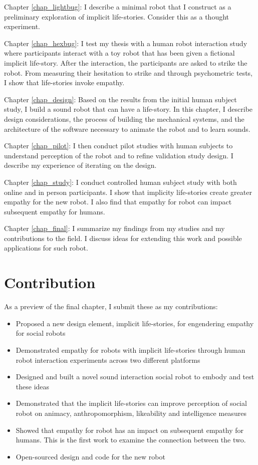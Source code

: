 Chapter \ref{chap_lightbug}: I describe a minimal robot that I construct as a preliminary exploration
of implicit life-stories. Consider this as a thought experiment. 

Chapter \ref{chap_hexbug}: I test my thesis with a human robot interaction study where participants interact with a toy robot that has been given a fictional implicit life-story. After the interaction, the participants are asked to strike the robot. From measuring their hesitation to strike and through psychometric tests, I show that life-stories invoke empathy.

Chapter \ref{chap_design}: Based on the results from the initial human subject study, I build a sound robot that can have a life-story. In this chapter, I describe design considerations, the process of building the mechanical systems, and the architecture of the software necessary to animate the robot and to learn sounds. 

Chapter \ref{chap_pilot}: I then conduct pilot studies with human subjects to understand perception of the robot and to refine validation study design. I describe my experience of iterating on the design. 


Chapter \ref{chap_study}: I conduct controlled human subject study with both online and in person participants. I show that implicity life-stories create greater empathy for the new robot. I also find that empathy for robot can impact subsequent empathy for humans. 

Chapter \ref{chap_final}: I summarize my findings from my studies and my contributions to the field. I discuss ideas for extending this work and possible applications for such robot.



\section{Contribution}
As a preview of the final chapter, I submit these as my contributions:


\begin{itemize}
\item Proposed a new design element, implicit life-stories, for engendering empathy for social robots
\item Demonstrated empathy for robots with implicit life-stories through human robot interaction experiments across two different platforms
\item Designed and built a novel sound interaction social robot to embody and test these ideas
\item Demonstrated that the implicit life-stories can improve perception of social robot on animacy, anthropomorphism, likeability and intelligence measures
\item Showed that empathy for robot has an impact on subsequent empathy for humans. This is the first work to examine the connection between the two.
\item Open-sourced design and code for the new robot
\end{itemize}







